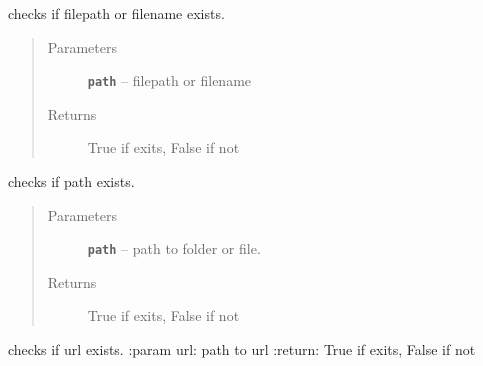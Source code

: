 \documentclass[letterpaper,10pt,english]{sphinxmanual}
\begin{document}
\begin{fulllineitems}
\label{RRtoolbox.lib:RRtoolbox.lib.directory.checkFile}
checks if filepath or filename exists.
\begin{quote}\begin{description}
\item[{Parameters}] \leavevmode
\textbf{\texttt{path}} -- filepath or filename

\item[{Returns}] \leavevmode
True if exits, False if not

\end{description}\end{quote}

\end{fulllineitems}


\begin{fulllineitems}
\label{RRtoolbox.lib:RRtoolbox.lib.directory.checkPath}
checks if path exists.
\begin{quote}\begin{description}
\item[{Parameters}] \leavevmode
\textbf{\texttt{path}} -- path to folder or file.

\item[{Returns}] \leavevmode
True if exits, False if not

\end{description}\end{quote}

\end{fulllineitems}


\begin{fulllineitems}
\label{RRtoolbox.lib:RRtoolbox.lib.directory.checkURL}
checks if url exists.
:param url: path to url
:return: True if exits, False if not

\end{fulllineitems}

\end{document}
